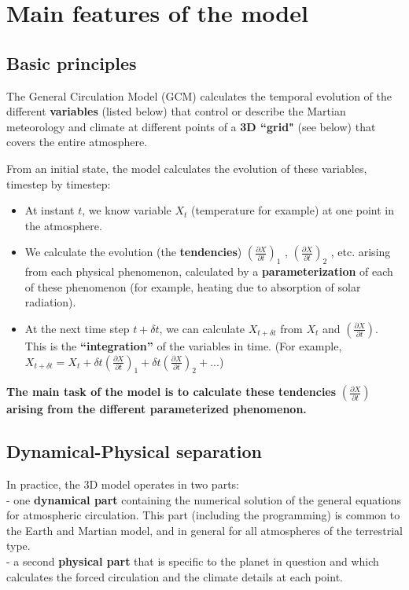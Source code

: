 \chapter{Main features of the model}

\label{sc:apercu}

\section{Basic principles}
The General Circulation Model (GCM) calculates the temporal evolution of
the different {\bf variables} (listed below) 
that control or describe the Martian meteorology and climate
at different points of a {\bf 3D ``grid" } (see below) that covers
the entire  atmosphere.

From an initial state, the model calculates the evolution of these variables,
timestep by timestep:
\begin{itemize}
\item At instant $t$, we know variable $X_t$ (temperature for example)
at one point in the atmosphere.

\item We calculate the evolution (the {\bf tendencies}) 
$(\frac{\partial X}{\partial t})_1$ ,
$(\frac{\partial X}{\partial t})_2$ , etc.
arising from each physical phenomenon,
calculated by a {\bf parameterization} of each of these phenomenon
(for example, heating due to absorption of solar radiation).

\item At the next time step $t + \delta t$, we can calculate $X_{t+ \delta t}$
from  $X_t$ and $(\frac{\partial X}{\partial t})$.
This is the {\bf``integration''} of the variables in time.
(For example, $X_{t+ \delta t}=X_t +
 \delta t(\frac{\partial X}{\partial t})_1 +
 \delta t(\frac{\partial X}{\partial t})_2 + ...$)

\end{itemize} 

{\bf The main task of the model is to calculate these tendencies}
$(\frac{\partial X}{\partial t})$
{\bf arising from the different parameterized phenomenon.}

\section{Dynamical-Physical separation}

In practice, the 3D model operates in two parts:\\
- one {\bf dynamical part} containing the numerical solution of
the general equations for atmospheric circulation.
This part (including the programming) is common to the Earth and Martian model,
and in general for all atmospheres of the terrestrial type.\\
- a second {\bf physical part} that is specific to the planet in question and
which calculates the forced circulation and the climate details at each point.

